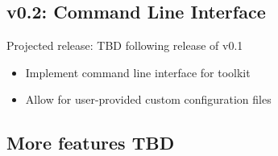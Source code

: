 \documentclass{article}
\begin{document}
\subsection{v0.2: Command Line Interface}
Projected release: TBD following release of v0.1
\begin{itemize}
    \item Implement command line interface for toolkit
    \item Allow for user-provided custom configuration files
\end{itemize}
\subsection{More features TBD}
\end{document}
